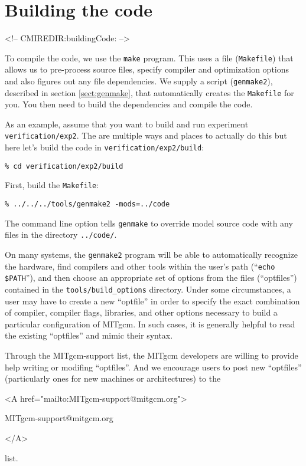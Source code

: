 \section[Building MITgcm]{Building the code}
\label{sect:buildingCode}
\begin{rawhtml}
<!-- CMIREDIR:buildingCode: -->
\end{rawhtml}

To compile the code, we use the \texttt{make} program. This uses a
file (\texttt{Makefile}) that allows us to pre-process source files,
specify compiler and optimization options and also figures out any
file dependencies. We supply a script (\texttt{genmake2}), described
in section \ref{sect:genmake}, that automatically creates the
\texttt{Makefile} for you. You then need to build the dependencies and
compile the code.

As an example, assume that you want to build and run experiment
\texttt{verification/exp2}. The are multiple ways and places to
actually do this but here let's build the code in
\texttt{verification/exp2/build}:
\begin{verbatim}
% cd verification/exp2/build
\end{verbatim}
First, build the \texttt{Makefile}:
\begin{verbatim}
% ../../../tools/genmake2 -mods=../code
\end{verbatim}
The command line option tells \texttt{genmake} to override model source
code with any files in the directory \texttt{../code/}.

On many systems, the \texttt{genmake2} program will be able to
automatically recognize the hardware, find compilers and other tools
within the user's path (``\texttt{echo \$PATH}''), and then choose an
appropriate set of options from the files (``optfiles'') contained in
the \texttt{tools/build\_options} directory.  Under some
circumstances, a user may have to create a new ``optfile'' in order to
specify the exact combination of compiler, compiler flags, libraries,
and other options necessary to build a particular configuration of
MITgcm.  In such cases, it is generally helpful to read the existing
``optfiles'' and mimic their syntax.

Through the MITgcm-support list, the MITgcm developers are willing to
provide help writing or modifing ``optfiles''.  And we encourage users
to post new ``optfiles'' (particularly ones for new machines or
architectures) to the 
\begin{rawhtml} <A href="mailto:MITgcm-support@mitgcm.org"> \end{rawhtml}
MITgcm-support@mitgcm.org
\begin{rawhtml} </A> \end{rawhtml}
list.

